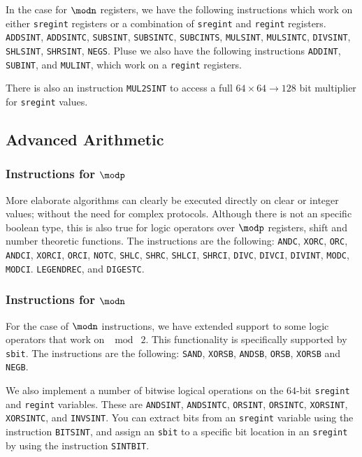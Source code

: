 In  the case for $\modn$ registers, we have the following instructions
which work on either \verb|sregint| registers or a combination
of \verb|sregint| and \verb|regint| registers.
	\verb+ADDSINT+,
	\verb+ADDSINTC+,
	\verb+SUBSINT+,
	\verb+SUBSINTC+,
	\verb+SUBCINTS+,
	\verb+MULSINT+,
	\verb+MULSINTC+,
	\verb+DIVSINT+,
	\verb+SHLSINT+,
	\verb+SHRSINT+,
	\verb+NEGS+.
Pluse we also have the following instructions 
  \verb+ADDINT+,
  \verb+SUBINT+, and
  \verb+MULINT+,
which work on a \verb|regint| registers.

There is also an instruction \verb+MUL2SINT+ to access a
full $64 \times 64 \longrightarrow 128$ bit multiplier
for \verb|sregint| values.

\subsection{Advanced Arithmetic}
\subsubsection{Instructions for $\modp$}
More elaborate algorithms can clearly be executed directly on
clear or integer values; without the need for complex
protocols. Although there is not an specific boolean type, this is also true for logic operators over $\modp$ registers, shift and number
theoretic functions. The instructions are the following:
    \verb+ANDC+,
    \verb+XORC+,
    \verb+ORC+,
    \verb+ANDCI+,
    \verb+XORCI+,
    \verb+ORCI+,
    \verb+NOTC+,
    \verb+SHLC+,
    \verb+SHRC+,
    \verb+SHLCI+,
    \verb+SHRCI+,
    \verb+DIVC+,
    \verb+DIVCI+,
    \verb+DIVINT+,
    \verb+MODC+,
    \verb+MODCI+.
    \verb+LEGENDREC+,
and
    \verb+DIGESTC+.
\subsubsection{Instructions for $\modn$}
For the case of $\modn$ instructions, we have extended support to some logic operators that work on $\mod \; 2$. 
This functionality is specifically supported by \verb+sbit+. 
The instructions are the following: 
\verb+SAND+,
\verb+XORSB+,
\verb+ANDSB+,
\verb+ORSB+,
\verb+XORSB+ and
\verb+NEGB+.

We also implement a number of bitwise logical operations on the $64$-bit
\verb|sregint| and \verb|regint| variables. These are
\verb+ANDSINT+, 
\verb+ANDSINTC+,
\verb+ORSINT+, 
\verb+ORSINTC+,
\verb+XORSINT+, 
\verb+XORSINTC+,
and
\verb+INVSINT+.
You can extract bits from an \verb|sregint| variable using the instruction
\verb+BITSINT+, and assign an \verb|sbit| to a specific bit location in
an \verb|sregint| by using the instruction \verb+SINTBIT+.

